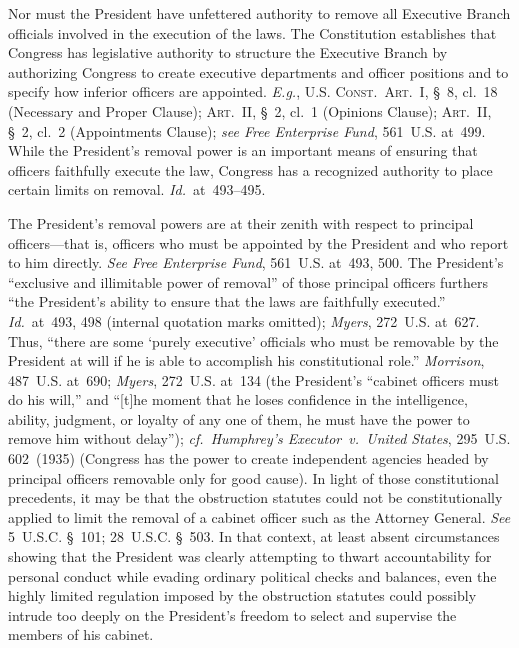 Nor must the President have unfettered authority to remove all Executive Branch officials involved in the execution of the laws.
The Constitution establishes that Congress has legislative authority to structure the Executive Branch by authorizing Congress to create executive departments and officer positions and to specify how inferior officers are appointed.
\textit{E.g.}, \textsc{U.S. Const.\ Art.~I}, \S~8, cl.~18 (Necessary and Proper Clause); \textsc{Art.~II}, \S~2, cl.~1 (Opinions Clause); \textsc{Art.~II}, \S~2, cl.~2 (Appointments Clause);
\textit{see Free Enterprise Fund}, 561~U.S. at~499. While the President's removal power is an important means of ensuring that officers faithfully execute the law, Congress has a recognized authority to place certain limits on removal.
\textit{Id.}~at~493--495.

The President's removal powers are at their zenith with respect to principal officers---that is, officers who must be appointed by the President and who report to him directly.
\textit{See Free Enterprise Fund}, 561~U.S. at~493, 500.
The President's ``exclusive and illimitable power of removal'' of those principal officers furthers ``the President's ability to ensure that the laws are faithfully executed.''
\textit{Id.}~at~493, 498 (internal quotation marks omitted);
\textit{Myers}, 272~U.S. at~627.
Thus, ``there are some `purely executive' officials who must be removable by the President at will if he is able to accomplish his constitutional role.''
\textit{Morrison}, 487~U.S. at~690;
\textit{Myers}, 272~U.S. at~134 (the President's ``cabinet officers must do his will,'' and ``[t]he moment that he loses confidence in the intelligence, ability, judgment, or loyalty of any one of them, he must have the power to remove him without delay'');
\textit{cf.~Humphrey's Executor~v.\ United States}, 295~U.S. 602~(1935) (Congress has the power to create independent agencies headed by principal officers removable only for good cause).
In light of those constitutional precedents, it may be that the obstruction statutes could not be constitutionally applied to limit the removal of a cabinet officer such as the Attorney General.
\textit{See} 5~U.S.C. \S~101; 28~U.S.C. \S~503.
In that context, at least absent circumstances showing that the President was clearly attempting to thwart accountability for personal conduct while evading ordinary political checks and balances, even the highly limited regulation imposed by the obstruction statutes could possibly intrude too deeply on the President's freedom to select and supervise the members of his cabinet.

